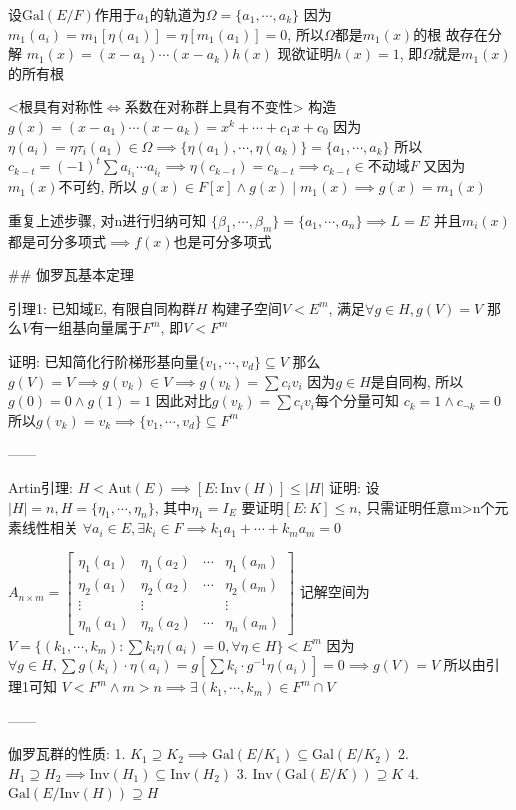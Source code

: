 设$\text{Gal}(E/F)$作用于$a_1$的轨道为$\Omega=\{a_1,\cdots,a_k\}$
因为 $m_1(a_i)=m_1[\eta(a_1)]=\eta[m_1(a_1)]=0$, 所以$\Omega$都是$m_1(x)$的根
故存在分解 $m_1(x)=(x-a_1)\cdots(x-a_k)h(x)$
现欲证明$h(x)=1$, 即$\Omega$就是$m_1(x)$的所有根

<根具有对称性$\iff$系数在对称群上具有不变性>
构造 $g(x)=(x-a_1)\cdots(x-a_k)=x^k+\cdots+c_1x+c_0$
因为 $\eta(a_i)=\eta\tau_i(a_1)\in\Omega\implies\{\eta(a_1),\cdots,\eta(a_k)\}=\{a_1,\cdots,a_k\}$
所以 $c_{k-t}=(-1)^t\sum a_{i_1}\cdots a_{i_t}\implies\eta(c_{k-t})=c_{k-t}\implies c_{k-t}\in 不动域F$
又因为$m_1(x)$不可约, 所以 $g(x)\in F[x]\land g(x)\mid m_1(x)\implies g(x)=m_1(x)$

重复上述步骤, 对n进行归纳可知 $\{\beta_1,\cdots,\beta_m\}=\{a_1,\cdots,a_n\}\implies L=E$
并且$m_i(x)$都是可分多项式$\implies f(x)$也是可分多项式


## 伽罗瓦基本定理

引理1: 已知域E, 有限自同构群$H$
构建子空间$V<E^m$, 满足$\forall g\in H,g(V)=V$
那么$V$有一组基向量属于$F^m$, 即$V<F^m$

证明: 已知简化行阶梯形基向量$\{v_1,\cdots,v_d\}\subseteq V$
那么$g(V)=V\implies g(v_k)\in V\implies g(v_k)=\sum c_iv_i$
因为$g\in H$是自同构, 所以$g(0)=0\land g(1)=1$
因此对比$g(v_k)=\sum c_iv_i$每个分量可知 $c_k=1\land c_{\lnot k}=0$
所以$g(v_k)=v_k\implies\{v_1,\cdots,v_d\}\subseteq F^m$

------

Artin引理: $H<\text{Aut}(E)\implies[E:\text{Inv}(H)]\leq|H|$
证明: 设$|H|=n,H=\{\eta_1,\cdots,\eta_n\}$, 其中$\eta_1=I_E$
要证明$[E:K]\leq n$, 只需证明任意m>n个元素线性相关
$\forall a_i\in E,\exists k_i\in F\implies k_1a_1+\cdots+k_ma_m=0$
 
$A_{n\times m}=\begin{bmatrix}
    \eta_1(a_1) & \eta_1(a_2) & \cdots & \eta_1(a_m) \\
    \eta_2(a_1) & \eta_2(a_2) & \cdots & \eta_2(a_m) \\
    \vdots & \vdots &  & \vdots \\
    \eta_n(a_1) & \eta_n(a_2) & \cdots & \eta_n(a_m)
\end{bmatrix}$
记解空间为$V=\{(k_1,\cdots,k_m):\sum k_i\eta(a_i)=0,\forall\eta\in H\}<E^m$
因为 $\forall g\in H,\sum g(k_i)\cdot\eta(a_i)=g[\sum k_i\cdot g^{-1}\eta(a_i)]=0\implies g(V)=V$
所以由引理1可知 $V<F^m\land m>n\implies\exists(k_1,\cdots,k_m)\in F^m\cap V$

------

伽罗瓦群的性质:
1. $K_1\supseteq K_2\implies\text{Gal}(E/K_1)\subseteq\text{Gal}(E/K_2)$
2. $H_1\supseteq H_2\implies\text{Inv}(H_1)\subseteq\text{Inv}(H_2)$
3. $\text{Inv}(\text{Gal}(E/K))\supseteq K$
4. $\text{Gal}(E/\text{Inv}(H))\supseteq H$

